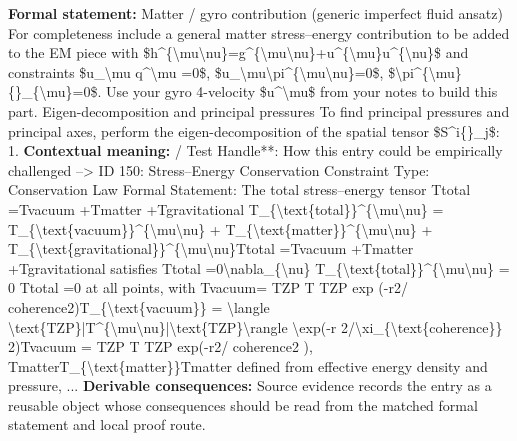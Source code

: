 \begingroup\footnotesize\setlength{\emergencystretch}{3em}\sloppy
\textbf{Formal statement:} Matter / gyro contribution (generic imperfect fluid ansatz) For completeness include a general matter stress--energy contribution to be added to the EM piece with \$h\textasciicircum{}\{\textbackslash{}mu\textbackslash{}nu\}=g\textasciicircum{}\{\textbackslash{}mu\textbackslash{}nu\}+u\textasciicircum{}\{\textbackslash{}mu\}u\textasciicircum{}\{\textbackslash{}nu\}\$ and constraints \$u\_\textbackslash{}mu q\textasciicircum{}\textbackslash{}mu =0\$, \$u\_\textbackslash{}mu\textbackslash{}pi\textasciicircum{}\{\textbackslash{}mu\textbackslash{}nu\}=0\$, \$\textbackslash{}pi\textasciicircum{}\{\textbackslash{}mu\}\{\}\_\{\textbackslash{}mu\}=0\$. Use your gyro 4-velocity \$u\textasciicircum{}\textbackslash{}mu\$ from your notes to build this part. Eigen-decomposition and principal pressures To find principal pressures and principal axes, perform the eigen-decomposition of the spatial tensor \$S\textasciicircum{}i\{\}\_j\$: 1.
\textbf{Contextual meaning:} / Test Handle**: How this entry could be empirically challenged --> ID 150: Stress--Energy Conservation Constraint Type: Conservation Law Formal Statement: The total stress--energy tensor Ttotal  =Tvacuum  +Tmatter  +Tgravitational  T\_\{\textbackslash{}text\{total\}\}\textasciicircum{}\{\textbackslash{}mu\textbackslash{}nu\} = T\_\{\textbackslash{}text\{vacuum\}\}\textasciicircum{}\{\textbackslash{}mu\textbackslash{}nu\} + T\_\{\textbackslash{}text\{matter\}\}\textasciicircum{}\{\textbackslash{}mu\textbackslash{}nu\} + T\_\{\textbackslash{}text\{gravitational\}\}\textasciicircum{}\{\textbackslash{}mu\textbackslash{}nu\}Ttotal   =Tvacuum   +Tmatter   +Tgravitational   satisfies   Ttotal  =0\textbackslash{}nabla\_\{\textbackslash{}nu\} T\_\{\textbackslash{}text\{total\}\}\textasciicircum{}\{\textbackslash{}mu\textbackslash{}nu\} = 0   Ttotal   =0 at all points, with Tvacuum= TZP T   TZP exp (-r2/ coherence2)T\_\{\textbackslash{}text\{vacuum\}\} = \textbackslash{}langle \textbackslash{}text\{TZP\}|T\textasciicircum{}\{\textbackslash{}mu\textbackslash{}nu\}|\textbackslash{}text\{TZP\}\textbackslash{}rangle \textbackslash{}exp(-r 2/\textbackslash{}xi\_\{\textbackslash{}text\{coherence\}\} 2)Tvacuum = TZP T   TZP exp(-r2/ coherence2 ), TmatterT\_\{\textbackslash{}text\{matter\}\}Tmatter defined from effective energy density and pressure, ...
\textbf{Derivable consequences:} Source evidence records the entry as a reusable object whose consequences should be read from the matched formal statement and local proof route.
